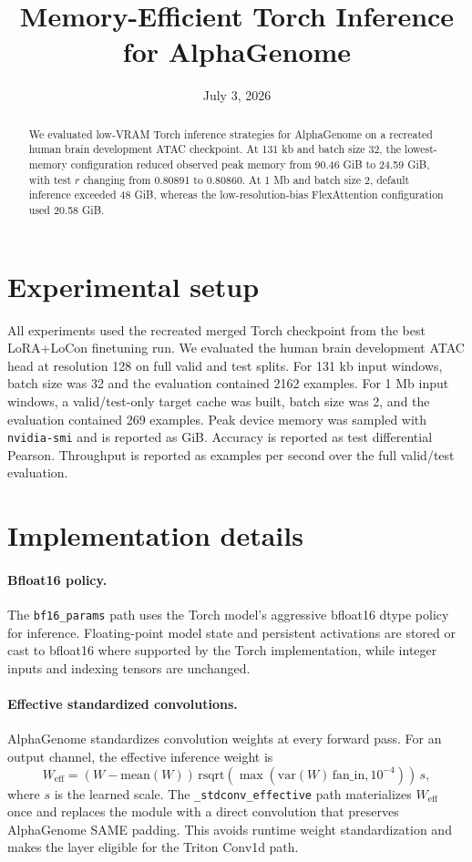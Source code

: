 \documentclass[11pt]{article}
\title{Memory-Efficient Torch Inference for AlphaGenome}
\author{}
\date{July 3, 2026}
\begin{document}
\maketitle

\begin{abstract}
We evaluated low-VRAM Torch inference strategies for AlphaGenome on a recreated
human brain development ATAC checkpoint. At 131 kb and batch size 32, the
lowest-memory configuration reduced observed peak memory from 90.46 GiB to
24.59 GiB, with test \(r\) changing from 0.80891 to 0.80860. At 1 Mb and batch
size 2, default inference exceeded 48 GiB, whereas the low-resolution-bias
FlexAttention configuration used 20.58 GiB.
\end{abstract}

\section{Experimental setup}

All experiments used the recreated merged Torch checkpoint from the best
LoRA+LoCon finetuning run. We evaluated the human brain development ATAC head
at resolution 128 on full valid and test splits. For 131 kb input windows,
batch size was 32 and the evaluation contained 2162 examples. For 1 Mb input
windows, a valid/test-only target cache was built, batch size was 2, and the
evaluation contained 269 examples. Peak device memory was sampled with
\texttt{nvidia-smi} and is reported as GiB. Accuracy is reported as test
differential Pearson. Throughput is reported as examples per second over the
full valid/test evaluation.

\section{Implementation details}

\paragraph{Bfloat16 policy.}
The \texttt{bf16\_params} path uses the Torch model's aggressive bfloat16 dtype
policy for inference. Floating-point model state and persistent activations are
stored or cast to bfloat16 where supported by the Torch implementation, while
integer inputs and indexing tensors are unchanged.

\paragraph{Effective standardized convolutions.}
AlphaGenome standardizes convolution weights at every forward pass. For an
output channel, the effective inference weight is
\[
  W_{\mathrm{eff}} =
  (W - \mathrm{mean}(W))\,
  \mathrm{rsqrt}\left(\max(\mathrm{var}(W)\,\mathrm{fan\_in}, 10^{-4})\right)\,
  s,
\]
where \(s\) is the learned scale. The \texttt{\_stdconv\_effective} path
materializes \(W_{\mathrm{eff}}\) once and replaces the module with a direct
convolution that preserves AlphaGenome SAME padding. This avoids runtime weight
standardization and makes the layer eligible for the Triton Conv1d path.
\end{document}

